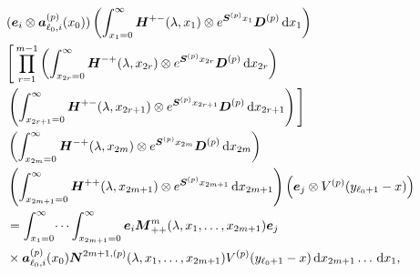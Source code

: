 \begin{align}
	&(\bs e_i \otimes \bs   a_{\ell_0,i}^{(p)}(x_0)) \left( \int_{x_1=0}^\infty \bs H^{+-}(\lambda,x_1)\otimes e^{\bs{S}^{(p)}x_1}\bs{D}^{(p)}\wrt x_1 \right)\nonumber%
	\\&\Bigg[\prod_{r=1}^{m-1} \left(\int_{x_{2r}=0}^\infty \bs H^{-+}(\lambda,x_{2r}) \otimes e^{\bs{S}^{(p)}x_{2r}}\bs{D}^{(p)}\wrt x_{2r}\right) \nonumber 
	\\&\nonumber \left(\int_{x_{2r+1}=0}^\infty \bs H^{+-}(\lambda,x_{2r+1})
	\otimes e^{\bs{S}^{(p)}x_{2r+1}}\bs{D}^{(p)} \wrt x_{2r+1} \right)\Bigg] 
	\\&\left(\int_{x_{2m}=0}^\infty \bs H^{-+}(\lambda,x_{2m})
	  \otimes e^{\bs{S}^{(p)}x_{2m}}\bs{D}^{(p)} \wrt x_{2m} \right) \nonumber 
	\\&\left(\int_{x_{2m+1}=0}^\infty \bs H^{++}(\lambda,x_{2m+1})\otimes 
	e^{\bs{S}^{(p)}x_{2m+1}} \wrt x_{2m+1}\right) \left(\bs e_j \otimes V^{(p)}(y_{\ell_0+1}-x)\right) \nonumber
	\\&=\int_{x_1=0}^\infty \dots \int_{x_{2m+1}=0}^\infty \bs e_i\bs M^{m}_{++}(\lambda,x_1,\dots,x_{2m+1})\bs e_j \nonumber 
	\\&\times \bs a_{\ell_0,i}^{(p)}(x_0) \bs N^{2m+1,(p)}(\lambda,x_1,\dots,x_{2m+1}) V^{(p)}(y_{\ell_0+1}-x)\wrt x_{2m+1}\dots\wrt x_1 ,

\end{align}

